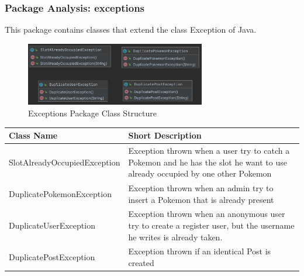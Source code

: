\subsubsection{Package Analysis: exceptions}
This package contains classes that extend the class Exception of Java. 
\begin{figure}[H]
	\centering
	\includegraphics[width=0.7\textwidth]{img/exceptions_package.png}
	\caption{Exceptions Package Class Structure}
\end{figure}
\begin{center}
	\begin{tabular}{| m{14em} | m{19em} |} 
		\hline
		\textbf{Class Name} & \textbf{Short Description} \\ [0.5ex] 
		\hline
		SlotAlreadyOccupiedException &Exception thrown when a user try to catch a Pokemon and he has the slot he want to use already occupied by one other Pokemon\\ 
		\hline
		DuplicatePokemonException & Exception thrown when an admin try to insert a Pokemon that is already present\\ 
		\hline
		DuplicateUserException & Exception thrown when an anonymous user try to create a register user, but the username he writes is already taken.\\ 
		\hline
		DuplicatePostException & Exception thrown if an identical Post is created\\ 
		\hline
	\end{tabular}
\end{center}
